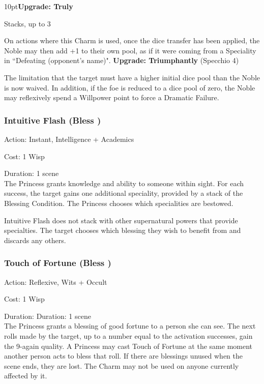 \begin{myindentpar}{10pt}\textbf{Upgrade: Truly}

Stacks, up to 3

On actions where this Charm is used, once the dice transfer has been applied, the Noble may then add +1 to their own pool, as if it were coming from a Speciality in \textquotedblleft Defeating (opponent's name)".
\textbf{Upgrade: Triumphantly} (Specchio 4)

The limitation that the target must have a higher initial dice pool than the Noble is now waived. In addition, if the foe is reduced to a dice pool of zero, the Noble may reflexively spend a Willpower point to force a Dramatic Failure.\end{myindentpar}

\subsubsection*{Intuitive Flash (Bless \textbullet\textbullet)}

\noindent Action: Instant, Intelligence + Academics

\noindent Cost: 1 Wisp

\noindent Duration: 1 scene \\

\noindent The Princess grants knowledge and ability to someone within sight. For each success, the target gains one additional speciality, provided by a stack of the Blessing Condition. The Princess chooses which specialities are bestowed. 

Intuitive Flash does not stack with other supernatural powers that provide specialties. The target chooses which blessing they wish to benefit from and discards any others.

\subsubsection*{Touch of Fortune (Bless \textbullet\textbullet)}

\noindent Action: Reflexive, Wits + Occult

\noindent Cost: 1 Wisp

\noindent Duration: Duration: 1 scene \\

\noindent The Princess grants a blessing of good fortune to a person she can see. The next rolls made by the target, up to a number equal to the activation successes, gain the 9-again quality. A Princess may cast Touch of Fortune at the same moment another person acts to bless that roll. If there are blessings unused when the scene ends, they are lost. The Charm may not be used on anyone currently affected by it. 

